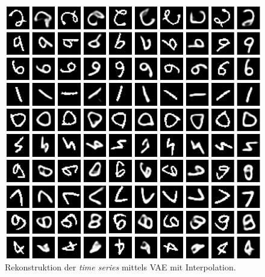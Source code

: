 \documentclass[12pt]{article}
\begin{document}
	\begin{figure}[!htbp]
		\centering
		\includegraphics[scale=0.8]{interpolation}
		\caption{Rekonstruktion der \emph{time series} mittels VAE mit Interpolation.}
		\label{Abb:VAEmitInterpol}
	\end{figure}
\end{document}

